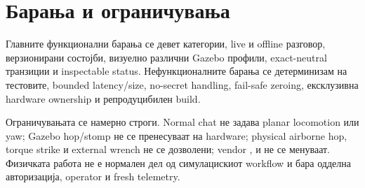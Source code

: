 \section{Барања и ограничувања}

Главните функционални барања се девет категории, live и offline разговор,
верзионирани состојби, визуелно различни Gazebo профили, exact-neutral
транзиции и inspectable status. Нефункционалните барања се детерминизам на
тестовите, bounded latency/size, no-secret handling, fail-safe zeroing,
ексклузивна hardware ownership и репродуцибилен build.

Ограничувањата се намерно строги. Normal chat не задава planar locomotion или
yaw; Gazebo hop/stomp не се пренесуваат на hardware; physical airborne hop,
torque strike и external wrench не се дозволени; vendor ,
 и  не се менуваат. Физичката работа не е нормален
дел од симулацискиот workflow и бара одделна авторизација, operator и fresh
telemetry.
